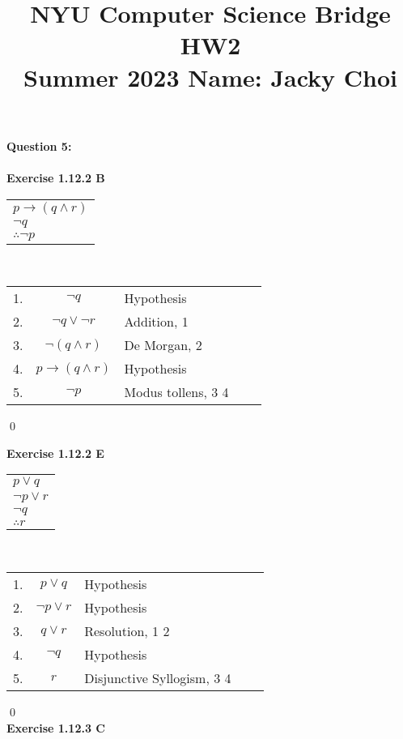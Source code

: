 \documentclass[11pt]{article}
\title{\textbf{NYU Computer Science Bridge HW2}\\
Summer 2023 Name: Jacky Choi}
\date{}
\begin{document}
\setul{}{2pt}

\maketitle

\noindent \textbf{Question 5:}\\\\
\textbf{Exercise 1.12.2 B }
\begin{center}
  \begin{tabular}{l}
    $p \rightarrow (q \wedge r)$\\
  	$\neg q$\\
	\hline
   $ \therefore \neg p$\\
  \end{tabular} \\
 \begin{center}
  \begin{tabular}{lclcl}
1.& $\neg q$ & Hypothesis\\
2.& $\neg q \vee \neg r$ & Addition, 1\\
3.& $\neg (q \wedge r)$ & De Morgan, 2\\
4.& $ p \rightarrow (q \wedge r) $ & Hypothesis\\
5.& $\neg p$& Modus tollens, 3 4\\ 

  \end{tabular}
\end{center}
\end{center}
\qed 


\noindent \textbf{Exercise 1.12.2 E}
\begin{center}
  \begin{tabular}{l}
    $p \vee q$\\
  $ \neg p \vee r$\\
    $  \neg q$\\
    \hline
   $ \therefore r$\\
  \end{tabular}\\
  \begin{center}
   \begin{tabular}{lclcl}
1.& $p \vee q$ & Hypothesis\\
2.& $\neg p \vee r$ & Hypothesis\\
3.& $q \vee r$ &Resolution, 1 2\\
4.& $ \neg q$ & Hypothesis\\
5.& $r$& Disjunctive Syllogism, 3 4\\
  \end{tabular}
\end{center}
\end{center}
\qed
\pagebreak\\
\noindent \textbf{Exercise 1.12.3 C}\\
\end{document}
